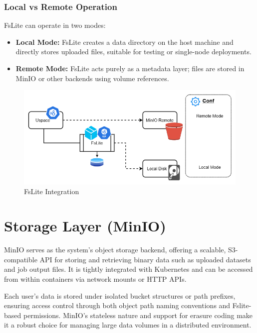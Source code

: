 \subsubsection{Local vs Remote Operation}

FsLite can operate in two modes:
\begin{itemize}
    \item \textbf{Local Mode:} FsLite creates a data directory on the host machine and directly stores uploaded files, suitable for testing or single-node deployments.
    \item \textbf{Remote Mode:} FsLite acts purely as a metadata layer; files are stored in MinIO or other backends using volume references.
\end{itemize}

\begin{figure}[h!]
  \centering
  \includegraphics[width=1\textwidth]{Images/fslite-block-diagram.png}
  \caption{FsLite Integration}
  \label{fig:fslite-integration}
\end{figure}



\section{Storage Layer (MinIO)}

MinIO serves as the system's object storage backend, offering a scalable, S3-compatible API for storing and retrieving binary data such as 
uploaded datasets and job output files. It is tightly integrated with Kubernetes and can be accessed from within containers via network mounts 
or HTTP APIs.

Each user’s data is stored under isolated bucket structures or path prefixes, ensuring access control through both object path naming 
conventions and Fslite-based permissions. MinIO's stateless nature and support for erasure coding make it a robust choice for managing large 
data volumes in a distributed environment.

